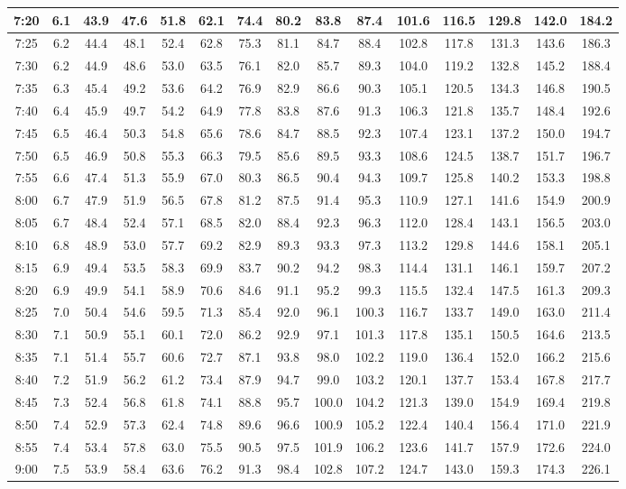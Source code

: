 \begin{footnotesize}
\begin{tabular}{c | c | c | c | c | c | c | c | c | c | c | c | c | c | c}
		7:20&6.1&43.9&47.6&51.8&62.1&74.4&80.2&83.8&87.4&101.6&116.5&129.8&142.0&184.2\\\hline
		7:25&6.2&44.4&48.1&52.4&62.8&75.3&81.1&84.7&88.4&102.8&117.8&131.3&143.6&186.3\\\hline
		7:30&6.2&44.9&48.6&53.0&63.5&76.1&82.0&85.7&89.3&104.0&119.2&132.8&145.2&188.4\\\hline
		7:35&6.3&45.4&49.2&53.6&64.2&76.9&82.9&86.6&90.3&105.1&120.5&134.3&146.8&190.5\\\hline
		7:40&6.4&45.9&49.7&54.2&64.9&77.8&83.8&87.6&91.3&106.3&121.8&135.7&148.4&192.6\\\hline
		7:45&6.5&46.4&50.3&54.8&65.6&78.6&84.7&88.5&92.3&107.4&123.1&137.2&150.0&194.7\\\hline
		7:50&6.5&46.9&50.8&55.3&66.3&79.5&85.6&89.5&93.3&108.6&124.5&138.7&151.7&196.7\\\hline
		7:55&6.6&47.4&51.3&55.9&67.0&80.3&86.5&90.4&94.3&109.7&125.8&140.2&153.3&198.8\\\hline
		8:00&6.7&47.9&51.9&56.5&67.8&81.2&87.5&91.4&95.3&110.9&127.1&141.6&154.9&200.9\\\hline
		8:05&6.7&48.4&52.4&57.1&68.5&82.0&88.4&92.3&96.3&112.0&128.4&143.1&156.5&203.0\\\hline
		8:10&6.8&48.9&53.0&57.7&69.2&82.9&89.3&93.3&97.3&113.2&129.8&144.6&158.1&205.1\\\hline
		8:15&6.9&49.4&53.5&58.3&69.9&83.7&90.2&94.2&98.3&114.4&131.1&146.1&159.7&207.2\\\hline
		8:20&6.9&49.9&54.1&58.9&70.6&84.6&91.1&95.2&99.3&115.5&132.4&147.5&161.3&209.3\\\hline
		8:25&7.0&50.4&54.6&59.5&71.3&85.4&92.0&96.1&100.3&116.7&133.7&149.0&163.0&211.4\\\hline
		8:30&7.1&50.9&55.1&60.1&72.0&86.2&92.9&97.1&101.3&117.8&135.1&150.5&164.6&213.5\\\hline
		8:35&7.1&51.4&55.7&60.6&72.7&87.1&93.8&98.0&102.2&119.0&136.4&152.0&166.2&215.6\\\hline
		8:40&7.2&51.9&56.2&61.2&73.4&87.9&94.7&99.0&103.2&120.1&137.7&153.4&167.8&217.7\\\hline
		8:45&7.3&52.4&56.8&61.8&74.1&88.8&95.7&100.0&104.2&121.3&139.0&154.9&169.4&219.8\\\hline
		8:50&7.4&52.9&57.3&62.4&74.8&89.6&96.6&100.9&105.2&122.4&140.4&156.4&171.0&221.9\\\hline
		8:55&7.4&53.4&57.8&63.0&75.5&90.5&97.5&101.9&106.2&123.6&141.7&157.9&172.6&224.0\\\hline
		9:00&7.5&53.9&58.4&63.6&76.2&91.3&98.4&102.8&107.2&124.7&143.0&159.3&174.3&226.1\\\hline
\end{tabular}\end{footnotesize}


